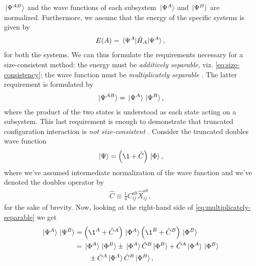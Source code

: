            $\ket*{\Psi^{AB}}$ and the wave functions of each subsystem
            $\ket*{\Psi^{A}}$ and $\ket*{\Psi^{B}}$ are normalized.
            Furthermore, we assume that the energy of the specific systems is
            given by
            \begin{align}
                E(A) = \mel*{\Psi^{A}}{\hat{H}_{A}}{\Psi^{A}},
            \end{align}
            for both the systems.
            We can thus formulate the requirements necessary for a
            size-consistent method: the energy must be \emph{additively
            separable}, viz. \autoref{eq:size-consistency}; the wave function
            must be \emph{multiplicately separable} \cite{helgaker-molecular}.
            The latter requirement is formulated by
            \begin{align}
                \ket*{\Psi^{AB}}
                = \ket*{\Psi^{A}}\ket*{\Psi^{B}},
                \label{eq:multiplicately-separable}
            \end{align}
            where the product of the two states is understood as each state
            acting on a subsystem.
            This last requirement is enough to demonstrate that truncated
            configuration interaction is \emph{not size-consistent}
            \cite{helgaker-molecular}.
            Consider the truncated doubles wave function
            \begin{align}
                \ket*{\Psi} = \para{\1 + \hat{C}}\ket*{\slat},
            \end{align}
            where we've assumed intermediate normalization of the wave function
            and we've denoted the doubles operator by
            \begin{align}
                \hat{C} \equiv \frac{1}{4}C^{ab}_{ij}\hat{X}^{ab}_{ij},
            \end{align}
            for the sake of brevity.
            Now, looking at the right-hand side of
            \autoref{eq:multiplicately-separable} we get
            \begin{align}
                \ket*{\Psi^{A}}\ket*{\Psi^{B}}
                &= \para{\1^{A} + \hat{C}^{A}}\ket*{\slat^A}
                \para{\1^{B} + \hat{C}^{B}}\ket*{\slat^B}
                \\
                &=
                \ket*{\slat^{A}}\ket*{\slat^{B}}
                \pm \ket*{\slat^{A}}\hat{C}^{B}\ket*{\slat^{B}}
                + \hat{C}^{A}\ket*{\slat^{A}}\ket*{\slat^{B}}
                \nonumber \\
                &\qquad
                \pm \hat{C}^{A}\ket*{\slat^{A}}\hat{C}^{B}\ket*{\slat^{B}},
            \end{align}
